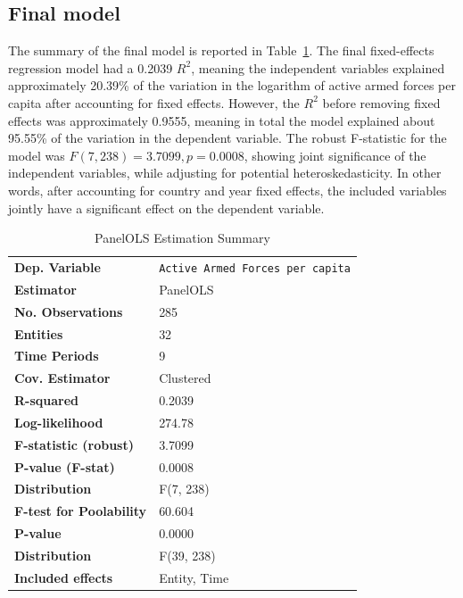 \subsection{Final model}

The summary of the final model is reported in Table~\ref{tab:model_summary}.
The final fixed-effects regression model had a 0.2039 $R^2$, meaning the independent 
variables explained 
approximately 20.39\% of the variation in the logarithm of active armed forces per capita 
after accounting for fixed effects. However, the $R^2$ before removing fixed effects was 
approximately 0.9555, meaning in total the model explained about 95.55\% of the variation 
in the dependent variable.
The robust F-statistic for the model was $F(7, 238)=3.7099, p=0.0008$, 
showing joint significance of the independent variables, while adjusting for potential 
heteroskedasticity.
In other words, after accounting for country and year fixed effects, 
the included variables jointly have a significant effect on the dependent variable.

\renewcommand{\arraystretch}{1.3}

\begin{table}[htbp]
\caption{PanelOLS Estimation Summary}
\centering
\begin{threeparttable}
\begin{tabularx}{\textwidth}{@{}lX@{}}
\toprule
\textbf{Dep. Variable} & \texttt{Active Armed Forces per capita} \\
\textbf{Estimator} & PanelOLS \\
\textbf{No. Observations} & 285 \\
\textbf{Entities} & 32 \\
\textbf{Time Periods} & 9 \\
\textbf{Cov. Estimator} & Clustered \\
\midrule
\textbf{R-squared} & 0.2039 \\
\textbf{Log-likelihood} & 274.78 \\
\textbf{F-statistic (robust)} & 3.7099 \\
\textbf{P-value (F-stat)} & 0.0008 \\
\textbf{Distribution} & F(7, 238) \\
\midrule
\textbf{F-test for Poolability} & 60.604 \\
\textbf{P-value} & 0.0000 \\
\textbf{Distribution} & F(39, 238) \\
\textbf{Included effects} & Entity, Time \\
\bottomrule
\end{tabularx}
\end{threeparttable}
\label{tab:model_summary}
\end{table} 

